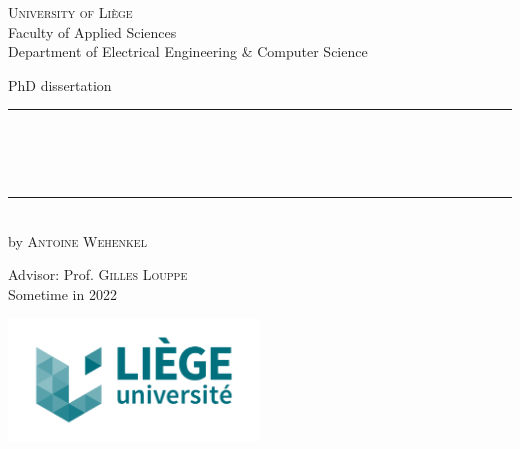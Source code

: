 
\begin{titlepage}
	\begin{addmargin}[-1cm]{-3cm}
    \begin{center}
        \large
        {\Large \textsc{University of Li{\`e}ge}}\\[1ex]
        Faculty of Applied Sciences\\
        Department of Electrical Engineering \& Computer Science\\

        \vfill

        PhD dissertation\\ \vskip1cm
        \rule{14cm}{0.4pt}\\ \bigskip
        \begingroup
            \Large
            \color{Maroon}\spacedallcaps{\myTitle} \\ \bigskip
        \endgroup
        \spacedlowsmallcaps{\mySubtitle} \\ \bigskip
        \rule{14cm}{0.4pt}\\ \vskip1cm
        by \textsc{Antoine Wehenkel}

        \vfill
        \vfill
        \vfill

        \hfill Advisor: Prof. \textsc{Gilles Louppe}\\
        \hfill Sometime in 2022
    \end{center}
    \vspace{-2.5cm}\includegraphics[width=0.5\textwidth]{figures/blason.pdf}
  \end{addmargin}
\end{titlepage}
